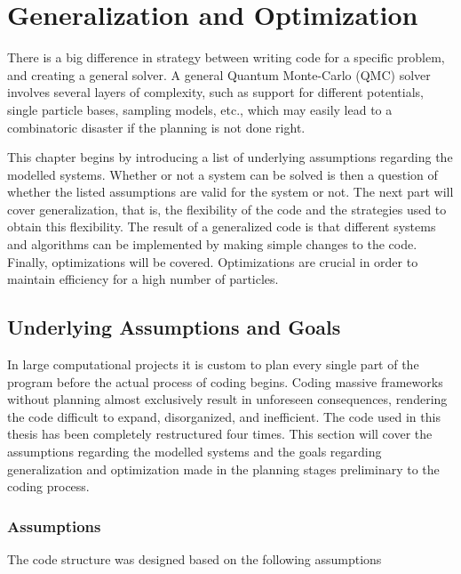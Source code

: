 \chapter{Generalization and Optimization}
\label{ch:optAndGen}

There is a big difference in strategy between writing code for a specific problem, and creating a general solver. A general Quantum Monte-Carlo (QMC) solver involves several layers of complexity, such as support for different potentials, single particle bases, sampling models, etc., which may easily lead to a combinatoric disaster if the planning is not done right. 

This chapter begins by introducing a list of underlying assumptions regarding the modelled systems. Whether or not a system can be solved is then a question of whether the listed assumptions are valid for the system or not. The next part will cover generalization, that is, the flexibility of the code and the strategies used to obtain this flexibility. The result of a generalized code is that different systems and algorithms can be implemented by making simple changes to the code. Finally, optimizations will be covered. Optimizations are crucial in order to maintain efficiency for a high number of particles. 

\section{Underlying Assumptions and Goals}
\label{sec:AssGoal}

In large computational projects it is custom to plan every single part of the program before the actual process of coding begins. Coding massive frameworks without planning almost exclusively result in unforeseen consequences, rendering the code difficult to expand, disorganized, and inefficient. The code used in this thesis has been completely restructured four times. This section will cover the assumptions regarding the modelled systems and the goals regarding generalization and optimization made in the planning stages preliminary to the coding process.

\subsection{Assumptions}
\label{sec:ass}

The code structure was designed based on the following assumptions

